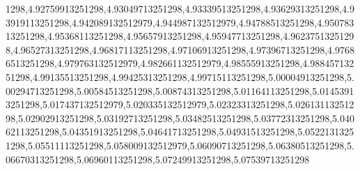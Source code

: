 1298,4.92759913251298,4.93049713251298,4.93339513251298,4.93629313251298,4.93919113251298,4.942089132512979,4.944987132512979,4.94788513251298,4.95078313251298,4.95368113251298,4.95657913251298,4.95947713251298,4.96237513251298,4.96527313251298,4.96817113251298,4.97106913251298,4.97396713251298,4.97686513251298,4.979763132512979,4.982661132512979,4.98555913251298,4.98845713251298,4.99135513251298,4.99425313251298,4.99715113251298,5.00004913251298,5.00294713251298,5.00584513251298,5.00874313251298,5.01164113251298,5.01453913251298,5.017437132512979,5.020335132512979,5.02323313251298,5.02613113251298,5.02902913251298,5.03192713251298,5.03482513251298,5.03772313251298,5.04062113251298,5.04351913251298,5.04641713251298,5.04931513251298,5.05221313251298,5.05511113251298,5.058009132512979,5.06090713251298,5.06380513251298,5.06670313251298,5.06960113251298,5.07249913251298,5.07539713251298
